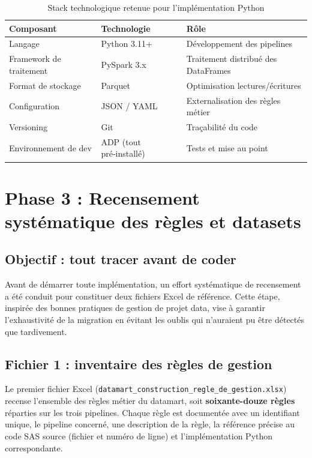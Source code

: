\begin{table}[H]
    \centering
    \caption{Stack technologique retenue pour l'implémentation Python}
    \label{tab:stack}
    \vspace{0.2cm}
    \begin{tabularx}{\textwidth}{@{}l l X@{}}
        \toprule
        \textbf{Composant} & \textbf{Technologie} & \textbf{Rôle} \\
        \midrule
        Langage & Python 3.11+ & Développement des pipelines \\
        Framework de traitement & PySpark 3.x & Traitement distribué des DataFrames \\
        Format de stockage & Parquet & Optimisation lectures/écritures \\
        Configuration & JSON / YAML & Externalisation des règles métier \\
        Versioning & Git & Traçabilité du code \\
        Environnement de dev & ADP (tout pré‑installé) & Tests et mise au point \\
        \bottomrule
    \end{tabularx}
\end{table}

\section{Phase 3 : Recensement systématique des règles et datasets}

\subsection{Objectif : tout tracer avant de coder}

Avant de démarrer toute implémentation, un effort systématique de recensement a été conduit pour constituer deux fichiers Excel de référence. Cette étape, inspirée des bonnes pratiques de gestion de projet data, vise à garantir l'exhaustivité de la migration en évitant les oublis qui n'auraient pu être détectés que tardivement.

\subsection{Fichier 1 : inventaire des règles de gestion}

Le premier fichier Excel (\texttt{datamart\_construction\_regle\_de\_gestion.xlsx}) recense l'ensemble des règles métier du datamart, soit \textbf{soixante-douze règles} réparties sur les trois pipelines. Chaque règle est documentée avec un identifiant unique, le pipeline concerné, une description de la règle, la référence précise au code SAS source (fichier et numéro de ligne) et l'implémentation Python correspondante.

